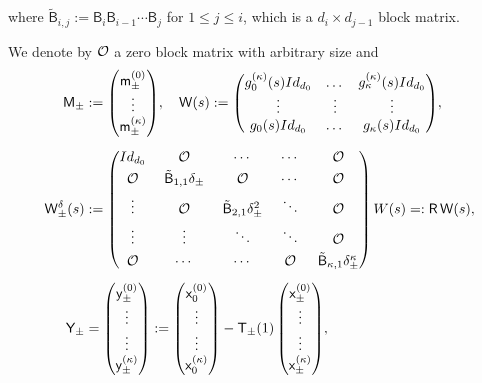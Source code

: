 \documentclass[10pt]{amsart}
\theoremstyle{definition}
\newcommand{\sB}{{\mathsf B}}
\newcommand{\sW}{{\mathsf W}}
\newcommand{\I}{\textup{Id}}\let\Id\I
\begin{document}
where $\tilde \sB_{i,j} := \sB_i \sB_{i-1} \cdots \sB_j$ for
$1 \le j \le i$, which is a $d_i \times d_{j-1}$ block matrix.

We denote by ${\mathcal O}$ a zero block matrix with arbitrary size and
\begin{align}\label{eq:matrices}
\mathsf M_\pm &:=
\begin{pmatrix}
\mathsf m^{(0)}_\pm \\
\vdots \\
\mathsf m^{(\kappa)} _\pm
\end{pmatrix}\!, \quad
\sW(s) :=
\begin{pmatrix}
g_0^{(\kappa)}(s) \I_{d_0} & \dots & g_\kappa ^{(\kappa)} (s)
\I_{d_0} \\
\vdots & \vdots & \vdots \\
g_0(s) \I_{d_0} & \dots & g_\kappa(s) \I_{d_0}
\end{pmatrix}\!, \\[5pt]
\sW_\pm ^\delta(s) &:=\arraycolsep6.5pt
\begin{pmatrix}
\I_{d_0} & \OO & \cdots & \cdots & \OO \\[3pt]
\OO & \tilde \sB_{1,1} \delta_{\pm} & \OO & \cdots & \OO \\[3pt]
\vdots & \OO & \tilde\sB_{2,1} \delta_\pm ^2 & \ddots & \OO \\[3pt]
\vdots & \vdots & \ddots & \ddots & \OO \\[3pt]
\OO & \cdots & \cdots & \OO & \tilde \sB_{\kappa,1} \delta_\pm ^\kappa
\end{pmatrix}
W(s) =: \mathsf R \, \mathsf W(s),\\[5pt]
\mathsf Y_\pm &=
\begin{pmatrix}
\mathsf y^{(0)} _\pm \\
\vdots \\
\vdots \\
\mathsf y^{(\kappa)} _\pm
\end{pmatrix}
:= \begin{pmatrix}
\mathsf x_0 ^{(0)} \\
\vdots \\
\vdots \\
\mathsf x_0 ^{(\kappa)}
\end{pmatrix} - \mathsf T_\pm(1) \begin{pmatrix}
\mathsf x^{(0)} _\pm \\
\vdots \\
\vdots \\
\mathsf x^{(\kappa)} _\pm
\end{pmatrix}\!,
\end{align}\vspace*{-10pt}
\end{document}
